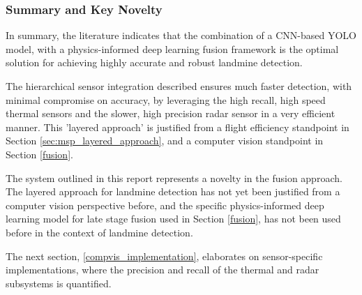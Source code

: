     
    \subsubsection{Summary and Key Novelty}


    
        \noindent In summary, the literature indicates that the combination of a CNN-based YOLO model, with a physics-informed deep learning fusion framework is the optimal solution for achieving highly accurate and robust landmine detection.

        \noindent The hierarchical sensor integration described ensures much faster detection, with minimal compromise on accuracy, by leveraging the high recall, high speed thermal sensors and the slower, high precision radar sensor in a very efficient manner. This 'layered approach' is justified from a flight efficiency standpoint in Section \ref{sec:msp_layered_approach}, and a computer vision standpoint in Section \ref{fusion}.
            
        \noindent The system outlined in this report represents a novelty in the fusion approach. The layered approach for landmine detection has not yet been justified from a computer vision perspective before, and the specific physics-informed deep learning model for late stage fusion used in Section \ref{fusion}, has not been used before in the context of landmine detection.

        The next section, \ref{compvis_implementation}, elaborates on sensor-specific implementations, where the precision and recall of the thermal and radar subsystems is quantified.


            
    
    
